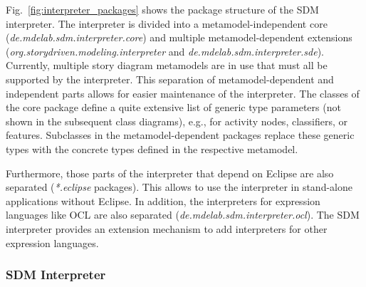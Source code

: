 Fig.~\ref{fig:interpreter_packages} shows the package structure of the SDM interpreter. The interpreter is divided into a metamodel-independent core (\emph{de.mdelab.sdm.interpreter.core})  and multiple metamodel-dependent extensions (\emph{org.storydriven.modeling.interpreter} and \emph{de.mdelab.sdm.interpreter.sde}). Currently, multiple story diagram metamodels are in use that must all be supported by the interpreter. This separation of metamodel-dependent and independent parts allows for easier maintenance of the interpreter. The classes of the core package define a quite extensive list of generic type parameters (not shown in the subsequent class diagrams), e.g., for activity nodes, classifiers, or features. Subclasses in the metamodel-dependent packages replace these generic types with the concrete types defined in the respective metamodel.

Furthermore, those parts of the interpreter that depend on Eclipse are also separated (\emph{*.eclipse} packages). This allows to use the interpreter in stand-alone applications without Eclipse. In addition, the interpreters for expression languages like OCL are also separated (\emph{de.mdelab.sdm.interpreter.ocl}). The SDM interpreter provides an extension mechanism to add interpreters for other expression languages.

\subsubsection{SDM Interpreter}
\label{sec:sdm_interpreter}

